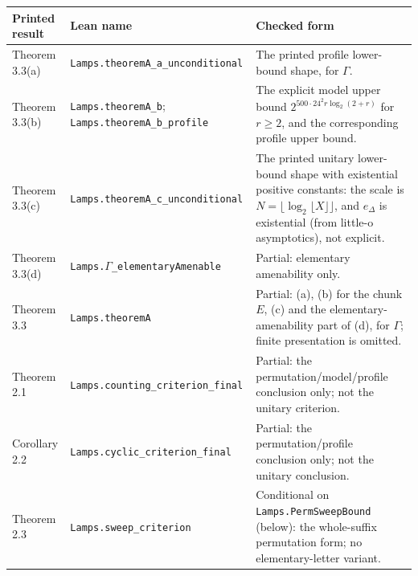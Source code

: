 \begin{center}\footnotesize
\begin{minipage}{\linewidth}
\setlength{\tabcolsep}{4pt}
\begin{tabular}{@{}>{\raggedright\arraybackslash}p{.15\linewidth}>{\raggedright\arraybackslash}p{.30\linewidth}>{\raggedright\arraybackslash}p{.49\linewidth}@{}}
\toprule Printed result & Lean name & Checked form\\\midrule
Theorem 3.3(a) & \nolinkurl{Lamps.theoremA_a_unconditional} & The printed profile lower-bound shape, for $\Gamma$.\\[4pt]
Theorem 3.3(b) & \nolinkurl{Lamps.theoremA_b}; \nolinkurl{Lamps.theoremA_b_profile} & The explicit model upper bound $2^{500\cdot24^2 r\log_2(2+r)}$ for $r\ge2$, and the corresponding profile upper bound.\\[4pt]
Theorem 3.3(c) & \nolinkurl{Lamps.theoremA_c_unconditional} & The printed unitary lower-bound shape with existential positive constants: the scale is $N=\lfloor\log_2\lfloor X\rfloor\rfloor$, and $e_\Delta$ is existential (from little-o asymptotics), not explicit.\\[4pt]
Theorem 3.3(d) & \texttt{Lamps.}$\Gamma$\texttt{\_elementaryAmenable} & Partial: elementary amenability only.\\[4pt]
Theorem 3.3 & \nolinkurl{Lamps.theoremA} & Partial: (a), (b) for the chunk $E$, (c) and the elementary-amenability part of (d), for $\Gamma$; finite presentation is omitted.\\[4pt]
Theorem 2.1 & \nolinkurl{Lamps.counting_criterion_final} & Partial: the permutation/model/profile conclusion only; not the unitary criterion.\\[4pt]
Corollary 2.2 & \nolinkurl{Lamps.cyclic_criterion_final} & Partial: the permutation/profile conclusion only; not the unitary conclusion.\\[4pt]
Theorem 2.3 & \nolinkurl{Lamps.sweep_criterion} & Conditional on \nolinkurl{Lamps.PermSweepBound} (below): the whole-suffix permutation form; no elementary-letter variant.\\
\bottomrule
\end{tabular}\end{minipage}\end{center}

